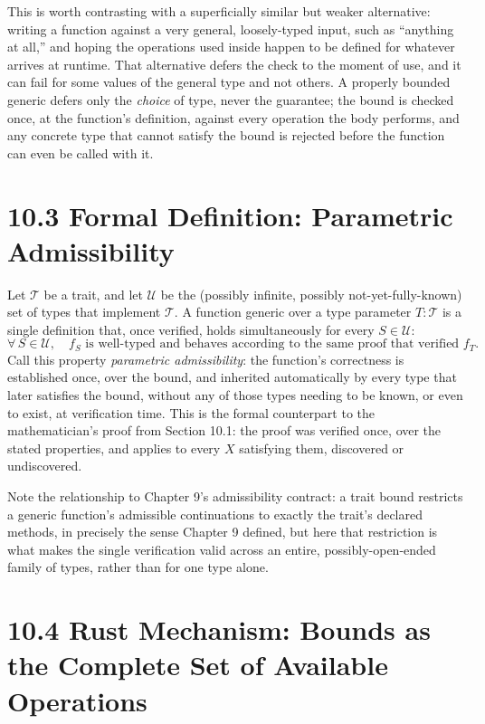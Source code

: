\documentclass[11pt]{book}
\begin{document}
This is worth contrasting with a superficially similar but weaker alternative: writing a function against a very general, loosely-typed input, such as ``anything at all,'' and hoping the operations used inside happen to be defined for whatever arrives at runtime. That alternative defers the check to the moment of use, and it can fail for some values of the general type and not others. A properly bounded generic defers only the \emph{choice} of type, never the guarantee; the bound is checked once, at the function's definition, against every operation the body performs, and any concrete type that cannot satisfy the bound is rejected before the function can even be called with it.

\section*{10.3 Formal Definition: Parametric Admissibility}

Let $\mathcal{T}$ be a trait, and let $\mathcal{U}$ be the (possibly infinite, possibly not-yet-fully-known) set of types that implement $\mathcal{T}$. A function generic over a type parameter $T: \mathcal{T}$ is a single definition that, once verified, holds simultaneously for every $S \in \mathcal{U}$:
\[
\forall\, S \in \mathcal{U}, \quad f_S \text{ is well-typed and behaves according to the same proof that verified } f_T.
\]
Call this property \emph{parametric admissibility}: the function's correctness is established once, over the bound, and inherited automatically by every type that later satisfies the bound, without any of those types needing to be known, or even to exist, at verification time. This is the formal counterpart to the mathematician's proof from Section 10.1: the proof was verified once, over the stated properties, and applies to every $X$ satisfying them, discovered or undiscovered.

Note the relationship to Chapter 9's admissibility contract: a trait bound restricts a generic function's admissible continuations to exactly the trait's declared methods, in precisely the sense Chapter 9 defined, but here that restriction is what makes the single verification valid across an entire, possibly-open-ended family of types, rather than for one type alone.

\section*{10.4 Rust Mechanism: Bounds as the Complete Set of Available Operations}
\end{document}

